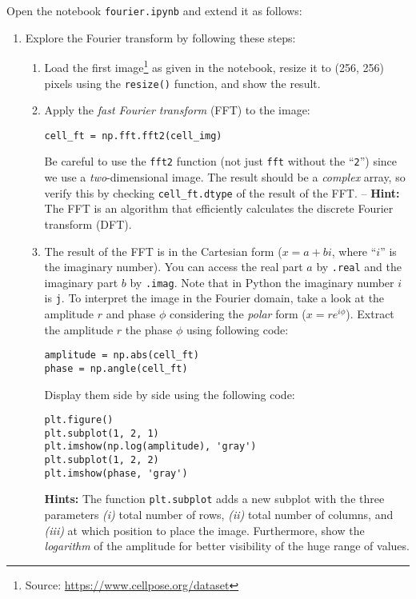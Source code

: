 \documentclass[12pt,a4paper]{article}
\begin{document}

\noindent
Open the notebook \texttt{fourier.ipynb} and extend it as follows:

\begin{enumerate}
\item Explore the Fourier transform by following these steps:
\begin{enumerate}
    \item Load the first image\footnote{Source: \url{https://www.cellpose.org/dataset}} as given in the notebook, resize it to (256, 256) pixels using the \texttt{resize()} function, and show the result.
    \item Apply the \emph{fast Fourier transform} (FFT) to the image:
    \begin{Verbatim}[frame=single]
cell_ft = np.fft.fft2(cell_img)
    \end{Verbatim}
    Be careful to use the \texttt{fft2} function (not just \texttt{fft} without the ``\texttt{2}'') since we use a \emph{two}-dimensional image. The result should be a \emph{complex} array, so verify this by checking \texttt{cell\_ft.dtype} of the result of the FFT. -- \textbf{Hint:} The FFT is an algorithm that efficiently calculates the discrete Fourier transform (DFT).
    \item The result of the FFT is in the Cartesian form ($x = a + bi$, where ``$i$'' is the imaginary number). You can access the real part $a$ by \texttt{.real} and the imaginary part $b$ by \texttt{.imag}. Note that in Python the imaginary number $i$ is \texttt{j}. To interpret the image in the Fourier domain, take a look at the amplitude $r$ and phase $\phi$ considering the \emph{polar} form ($x = re^{i\phi}$). Extract the amplitude $r$ the phase $\phi$ using following code:
    \begin{Verbatim}[frame=single]
amplitude = np.abs(cell_ft)
phase = np.angle(cell_ft)
    \end{Verbatim}
    Display them side by side using the following code:
    \begin{Verbatim}[frame=single]
plt.figure()
plt.subplot(1, 2, 1)
plt.imshow(np.log(amplitude), 'gray')
plt.subplot(1, 2, 2)
plt.imshow(phase, 'gray')
    \end{Verbatim}
    \textbf{Hints:} The function \texttt{plt.subplot} adds a new subplot with the three parameters \textit{(i)} total number of rows, \textit{(ii)} total number of columns, and \textit{(iii)} at which position to place the image. Furthermore, show the \emph{logarithm} of the amplitude for better visibility of the huge range of values.

\end{enumerate}
\end{enumerate}
\end{document}
